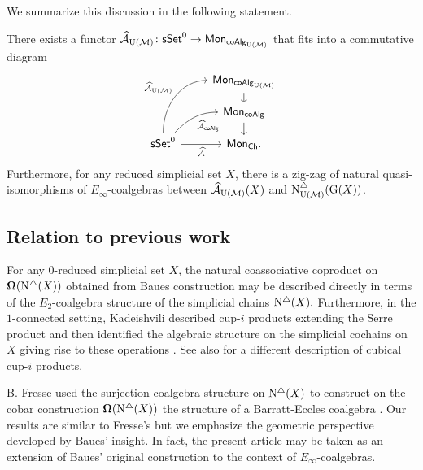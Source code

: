 We summarize this discussion in the following statement.

\begin{theorem} \label{t:2nd main thm in the intro} There exists a functor $\operatorname{\mathcal{\widehat{A}}}_{\operatorname{U}(\mathcal{M})} \colon \mathsf{sSet}^0 \to \mathsf{Mon}_{\mathsf{coAlg}_{\operatorname{U}(\mathcal{M})}}$ that fits into a commutative diagram
	\[
	\begin{tikzcd}[row sep=small]
	& \Mon_{\coAlg_\UM} \arrow[d] \\
	& \Mon_{\coAlg} \arrow[d] \\
	\sSet^0
	\arrow[r, "\Ahat"', ]
	\arrow[ru, "\Ahat_{\coAlg}"', out=45, in=180] 
	\arrow[ruu, "\Ahat_\UM", out=90, in=180]
	& \Mon_{\Ch}.
	\end{tikzcd}
	\]
	Furthermore, for any reduced simplicial set $X$, there is a zig-zag of natural quasi-isomorphisms of $E_{\infty}$-coalgebras between $\operatorname{\mathcal{\widehat{A}}}_{\operatorname{U}(\mathcal{M})}(X)$ and $\operatorname{N^{\triangle}_{{\operatorname{U}(\mathcal{M})}}}(\operatorname{G}(X))$.
\end{theorem}

\subsection*{Relation to previous work}

For any $0$-reduced simplicial set $X$, the natural coassociative coproduct on $\operatorname{\mathbf{\Omega}} (\operatorname{N^{\triangle}} (X))$ obtained from Baues construction may be described directly in terms of the $E_2$-coalgebra structure of the simplicial chains $\operatorname{N^{\triangle}}(X).$ Furthermore, in the $1$-connected setting, Kadeishvili described cup-$i$ products extending the Serre product and then identified the algebraic structure on the simplicial cochains on $X$ giving rise to these operations \cite{kadeishvili1999coproducts, kadeishvili2003cup-i}.
See also \cite{pilarczyk2016cubical} for a different description of cubical cup-$i$ products.

B. Fresse used the surjection coalgebra structure on $\operatorname{N^{\triangle}}(X)$ to construct on the cobar construction $\operatorname{\mathbf{\Omega}}(\operatorname{N^{\triangle}}(X))$ the  structure of a Barratt-Eccles coalgebra \cite{fresse2003hopf}.
Our results are similar to Fresse's but we emphasize the geometric perspective developed by Baues' insight.
In fact, the present article may be taken as an extension of Baues' original construction to the context of $E_{\infty}$-coalgebras.

